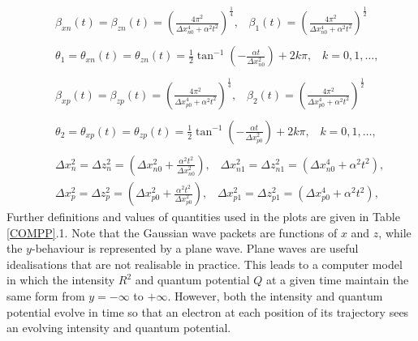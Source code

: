 \documentclass[12pt]{article}       %
\begin{document}
\begin{eqnarray}
&&\!\!\!\!\!\!\!\!\!\!\!\!\!\beta_{xn}(t)=\beta_{zn}(t) =\left( \frac{4\pi^2}{\Delta x_{n0}^4+\alpha^2 t^2}\right)^{\frac{1}{4}},\;\;\;\beta_{1}(t)=\left( \frac{4\pi^2}{\Delta x_{n0}^4+\alpha^2 t^2}\right)^{\frac{1}{2}}\nonumber\\ \nonumber\\
&&\!\!\!\!\!\!\!\!\!\!\!\!\!\theta_1=\theta_{xn}(t)=\theta_{zn}(t)  =\frac{1}{2} \tan^{-1} \left(-\frac{\alpha t}{\Delta x_{n0}^2}  \right)+2k\pi,\;\;\;k=0,1,\ldots,\nonumber\\ \nonumber\\
&&\!\!\!\!\!\!\!\!\!\!\!\!\!\beta_{xp}(t)=\beta_{zp}(t) =\left( \frac{4\pi^2}{\Delta x_{p0}^4+\alpha^2 t^2}\right)^{\frac{1}{4}},\;\;\;\beta_{2}(t)=\left( \frac{4\pi^2}{\Delta x_{p0}^4+\alpha^2 t^2}\right)^{\frac{1}{2}}\nonumber\\ \nonumber\\
&&\!\!\!\!\!\!\!\!\!\!\!\!\!\theta_2=\theta_{xp}(t)=\theta_{zp}(t)  =\frac{1}{2} \tan^{-1} \left(-\frac{\alpha t}{\Delta x_{p0}^2}  \right)+2k\pi,\;\;\;k=0,1,\ldots,\nonumber\\ \nonumber\\
&&\!\!\!\!\!\!\!\!\!\!\!\!\!\!\Delta x_n^2=\Delta z_n^2 =\left(\Delta x_{n0}^2+\frac{\alpha^2 t^2}{\Delta x_{n0}^2}\right),\;\;\;\Delta x_{n1}^2=\Delta z_{n1}^2=\left(\Delta x_{n0}^4+\alpha^2 t^2\right),\nonumber\\
&&\!\!\!\!\!\!\!\!\!\!\!\!\!\!\Delta x_p^2= \Delta z_p^2 =\left(\Delta x_{p0}^2+\frac{\alpha^2 t^2}{\Delta x_{p0}^2}\right),\;\;\;\Delta x_{p1}^2=\Delta z_{p1}^2=\left(\Delta x_{p0}^4+\alpha^2 t^2\right),\nonumber
\end{eqnarray}
Further definitions and values of quantities used in the plots are given in Table \ref{COMPP}.1.   Note that  the Gaussian wave packets are functions of $x$ and $z$, while the $y$-behaviour is represented by a plane wave. Plane  waves are useful  idealisations that are not realisable in practice. This leads to a computer model in which the intensity $R^2$ and quantum potential $Q$ at a given time maintain the same form from $y=-\infty$ to $+\infty$.	However, both the intensity and quantum potential evolve in time so that an electron at each position of its trajectory sees an evolving intensity and quantum potential. 
\end{document}
